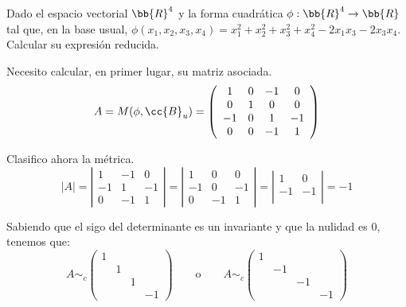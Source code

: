 \begin{ejercicio}
    Dado el espacio vectorial $\bb{R}^4$ y la forma cuadrática $\phi:\bb{R}^4 \to \bb{R}$ tal que, en la base usual, $\phi(x_1, x_2, x_3, x_4) = x_1^2 + x_2^2 + x_3^2 + x_4^2 - 2x_1x_3 - 2x_3x_4$. Calcular su expresión reducida.

    Necesito calcular, en primer lugar, su matriz asociada.
    \begin{equation*}
        A = M(\phi, \cc{B}_u) = \left(\begin{array}{cccc}
            1 & 0 & -1 & 0 \\
            0 & 1 & 0 & 0 \\
            -1 & 0 & 1 & -1\\
            0 & 0 & -1 & 1
        \end{array}\right)
    \end{equation*}

    Clasifico ahora la métrica.
    \begin{equation*}
        |A| = \left|\begin{array}{ccc}
            1 & -1 & 0 \\
            -1 & 1 & -1\\
            0 & -1 & 1
        \end{array}\right|
        = \left|\begin{array}{ccc}
            1 & 0 & 0 \\
            -1 & 0 & -1\\
            0 & -1 & 1
        \end{array}\right|
        = \left|\begin{array}{ccc}
            1 & 0 \\
            -1 & -1\\
        \end{array}\right| = -1
    \end{equation*}

    Sabiendo que el sigo del determinante es un invariante y que la nulidad es 0, tenemos que:
    \begin{equation*}
        A \sim_c \left(\begin{array}{cccc}
            1 &&& \\
            &1&& \\
            &&1&\\
            &&&-1
        \end{array}\right)
        \qquad \text{o} \qquad
        A \sim_c \left(\begin{array}{cccc}
            1 &&& \\
            &-1&& \\
            &&-1&\\
            &&&-1
        \end{array}\right)
    \end{equation*}


\end{ejercicio}
